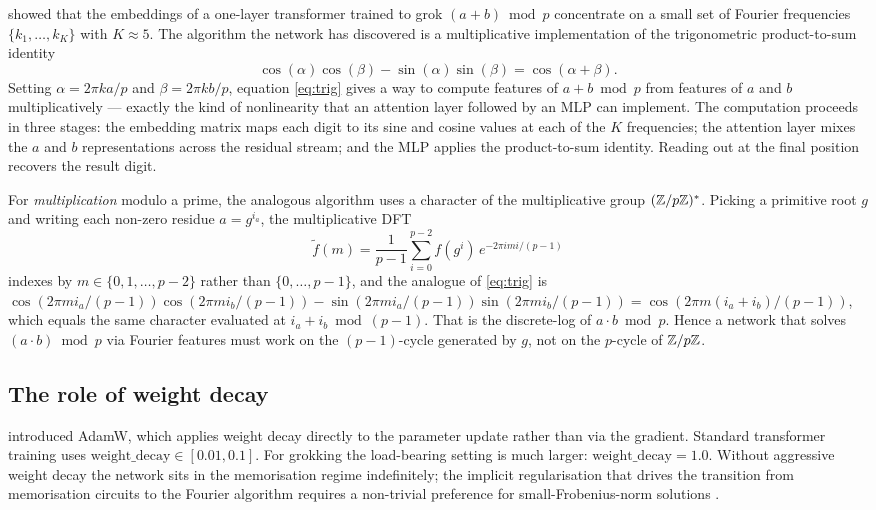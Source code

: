 \citet{nanda2023progress} showed that the embeddings of a one-layer
transformer trained to grok $(a + b) \bmod p$ concentrate on a small set of
Fourier frequencies $\{k_1, \ldots, k_K\}$ with $K \approx 5$. The
algorithm the network has discovered is a multiplicative implementation of
the trigonometric product-to-sum identity
\begin{equation}
\cos(\alpha) \cos(\beta) - \sin(\alpha) \sin(\beta) = \cos(\alpha + \beta).
\label{eq:trig}
\end{equation}
Setting $\alpha = 2\pi k a / p$ and $\beta = 2\pi k b / p$, equation
\eqref{eq:trig} gives a way to compute features of $a + b \bmod p$ from
features of $a$ and $b$ multiplicatively --- exactly the kind of
nonlinearity that an attention layer followed by an MLP can implement.
The computation proceeds in three stages: the embedding matrix maps each
digit to its sine and cosine values at each of the $K$ frequencies; the
attention layer mixes the $a$ and $b$ representations across the residual
stream; and the MLP applies the product-to-sum identity. Reading out at
the final position recovers the result digit.

For \emph{multiplication} modulo a prime, the analogous algorithm uses a
character of the multiplicative group $(\mathbb{Z}/p\mathbb{Z})^*$. Picking a primitive
root $g$ and writing each non-zero residue $a = g^{i_a}$, the
multiplicative DFT
\begin{equation}
\widetilde f(m) = \frac{1}{p - 1} \sum_{i = 0}^{p - 2}
                    f(g^i) \, e^{-2 \pi i m i / (p-1)}
\end{equation}
indexes by $m \in \{0, 1, \ldots, p-2\}$ rather than $\{0, \ldots, p-1\}$,
and the analogue of \eqref{eq:trig} is
$\cos(2\pi m i_a / (p-1)) \cos(2\pi m i_b / (p-1))
- \sin(2\pi m i_a / (p-1)) \sin(2\pi m i_b / (p-1))
= \cos(2\pi m (i_a + i_b) / (p-1))$,
which equals the same character evaluated at $i_a + i_b \bmod (p - 1)$.
That is the discrete-log of $a \cdot b \bmod p$. Hence a network that
solves $(a \cdot b) \bmod p$ via Fourier features must work on the
$(p - 1)$-cycle generated by $g$, not on the $p$-cycle of $\mathbb{Z}/p\mathbb{Z}$.

\subsection{The role of weight decay}

\citet{loshchilov2019adamw} introduced AdamW, which applies weight decay
directly to the parameter update rather than via the gradient. Standard
transformer training uses $\mathrm{weight\_decay} \in [0.01, 0.1]$. For
grokking the load-bearing setting is much larger:
$\mathrm{weight\_decay} = 1.0$. Without aggressive weight decay the
network sits in the memorisation regime indefinitely; the implicit
regularisation that drives the transition from memorisation circuits to
the Fourier algorithm requires a non-trivial preference for
small-Frobenius-norm solutions
\citep{liu2022understanding,liu2022omnigrok}.
